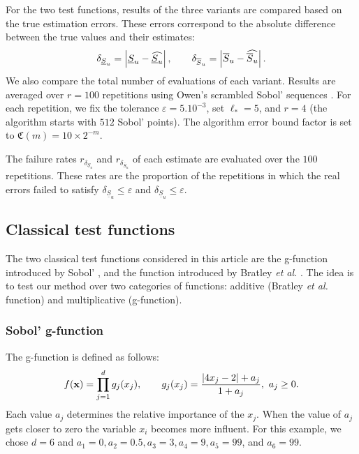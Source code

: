 For the two test functions, results of the three variants are compared based on the true estimation errors. These errors correspond to the absolute difference between the true values and their estimates:
$$\delta_{\underline{S}_u} = \left\lvert\underline{S}_u - \widehat{\underline{S}_u}\right\rvert, \qquad \delta_{\overline{S}_u} = \left\lvert\overline{S}_u - \widehat{\overline{S}_u}\right\rvert.$$
We also compare the total number of evaluations of each variant. Results are averaged over $r=100$ repetitions using Owen's scrambled Sobol' sequences \cite{HonHic00a,Owe95}. For each repetition, we fix the tolerance $\varepsilon=5.10^{-3}$, set $\ell_*=5$, and $r=4$ (the algorithm starts with $512$ Sobol' points). The algorithm error bound factor is set to $\mathfrak{C}(m)=10\times 2^{-m}$.

The failure rates $r_{\delta_{\underline{S}_u}}$ and  $r_{\delta_{\overline{S}_u}}$ of each estimate are evaluated over the $100$ repetitions. These rates are the proportion of the repetitions in which the real errors failed to satisfy $\delta_{\underline{S}_u} \leq \varepsilon$ and $\delta_{\underline{S}_u} \leq \varepsilon$.

%

\subsection{Classical test functions}
\label{sec:5.1}

The two classical test functions considered in this article are the g-function introduced by Sobol' \cite{Sobol'}, and the function introduced by Bratley \textit{et al.} \cite{Bratley}. The idea is to test our method over two categories of functions: additive (Bratley \textit{et al.} function) and multiplicative (g-function).

\subsubsection{Sobol' g-function}

The g-function is defined as follows:
\begin{equation*}
f(\boldsymbol{\mathbf{x}})= \prod \limits_{j=1}^{d}g_j(x_j), \qquad g_j(x_j)=\frac{\left |4x_j-2 \right | + a_j}{1 + a_j}, \ a_j \geq 0.
\end{equation*}
Each value $a_j$ determines the relative importance of the $x_j$. When the value of $a_j$ gets closer to zero the variable $x_i$ becomes more influent. For this example, we chose $d=6$ and $a_1=0,a_2=0.5, a_3=3, a_4=9, a_5=99$, and $a_6=99$.

